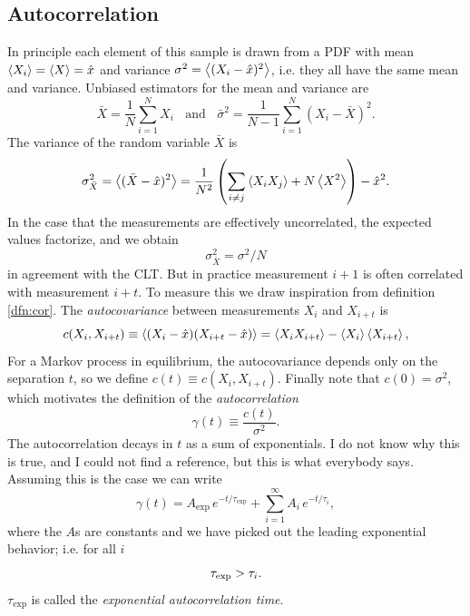 \subsection{Autocorrelation}

In principle each element of this sample is drawn
from a PDF with mean $\ev{X_i}=\ev{X}=\hat{x}$ and variance 
$\sigma^2=\ev{(X_i-\hat{x})^2}$, i.e. they all have the same mean
and variance. Unbiased estimators for the mean and variance are
\begin{equation}\label{eq:umv}
  \bar{X}=\frac{1}{N}\sum_{i=1}^N X_i
  ~~~~\text{and}~~~~
  \bar{\sigma}^2=\frac{1}{N-1}\sum_{i=1}^N (X_i-\bar{X})^2.
\end{equation}
The variance of the random variable $\bar{X}$ is
\begin{equation}\label{eq:tsvar}
  \sigma^2_{\bar{X}}=\ev{(\bar{X}-\hat{x})^2}
                    =\frac{1}{N^2}\left(\sum_{i\neq j}\ev{X_iX_j}
                     +N\ev{X^2}\right)-\hat{x}^2.
\end{equation}
In the case that the measurements are effectively uncorrelated, the expected values
factorize, and we obtain
\begin{equation}
  \sigma^2_{\bar{X}}=\sigma^2/N
\end{equation}
in agreement with the CLT. But in practice measurement
$i+1$ is often correlated with measurement $i+t$. 
To measure this we draw inspiration from 
definition \eqref{dfn:cor}. 
The {\it autocovariance} between measurements 
$X_i$ and $X_{i+t}$ is
  \begin{equation}\label{dfn:acov}
    c(X_i,X_{i+t})\equiv\ev{(X_i-\hat{x})(X_{i+t}-\hat{x})}
     =\ev{X_iX_{i+t}}-\ev{X_i}\ev{X_{i+t}},
  \end{equation}
For a Markov process in equilibrium, the autocovariance depends only on 
the separation $t$, so we define $c(t)\equiv c(X_i,X_{i+t})$. Finally note that
$c(0)=\sigma^2$, which motivates the definition of the {\it autocorrelation}
\begin{equation}\label{dfn:acor}
  \gamma(t)\equiv\frac{c(t)}{\sigma^2}.
\end{equation}
The autocorrelation decays in $t$ as a sum of exponentials. I do not
know why this is true, and I could not find a reference, but this is what
everybody says. Assuming this is the case we can write
\begin{equation}
  \gamma(t)=A_\text{exp}\,e^{-t/\tau_\text{exp}}
            +\sum_{i=1}^\infty A_i\,e^{-t/\tau_i},
\end{equation}
where the $A$s are constants and we have picked out the leading
exponential behavior; i.e. for all $i$
\begin{equation}\index{autocorrelation time!exponential}
  \tau_\text{exp}>\tau_i.
\end{equation}
$\tau_\text{exp}$ is called the {\it exponential autocorrelation time}.

